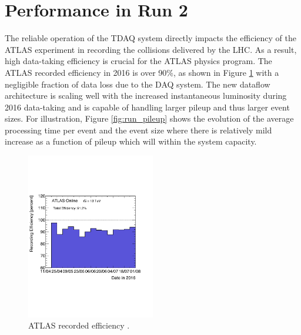 
\section{Performance in Run 2}

The reliable operation of the TDAQ system directly impacts the efficiency of the ATLAS experiment 
in recording the collisions delivered by the LHC. As a result, high data-taking efficiency is crucial 
for the ATLAS physics program.
The ATLAS recorded efficiency in 2016 is over 90\%, as shown in Figure \ref{fig:tdaq_diagram} with a negligible fraction of data 
loss due to 
the DAQ system. The new dataflow architecture is scaling well with the increased 
instantaneous luminosity during 2016 data-taking and is capable of handling larger pileup and thus larger event sizes.
For illustration,  Figure \ref{fig:run_pileup} shows the evolution of the average processing time per event and 
the event size where there is relatively mild increase as a function of pileup which will within the system capacity.

\begin{figure}[t!]
\vspace{-0.5cm}
\centering
\includegraphics[width=0.5\textwidth]{recEffByWeek-1} 
\vspace{-2.5cm}
\caption{ATLAS recorded efficiency \cite{atlasTwiki}.}
\label{fig:tdaq_diagram}
\end{figure} 


